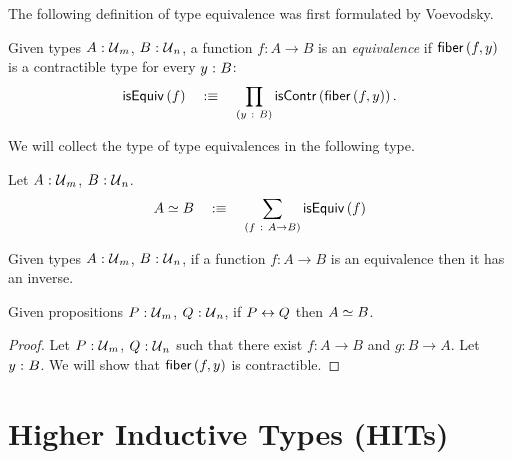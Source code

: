 The following definition of type equivalence was first formulated by Voevodsky.

\begin{defn}
  Given types $A\hspace{0.1mm}:\hspace{0.1mm}\mathcal{U}{}_m$, $B\hspace{0.1mm}:\hspace{0.1mm}\mathcal{U}{}_n$, a function $f : A \rightarrow B$ is an
  \emph{equivalence} if $\mathsf{fiber}\left(f, y\right)$ is a contractible type for every $y\hspace{0.1mm}:\hspace{0.1mm}B$:
  \begin{equation*}
    \mathsf{isEquiv}\left(f\right) \quad:\equiv\quad \prod_{(y~:~B)} \mathsf{isContr}\left(\mathsf{fiber}\left(f, y\right)\right).
  \end{equation*}
\end{defn}

We will collect the type of type equivalences in the following type.

\begin{defn}
  Let $A\hspace{0.1mm}:\hspace{0.1mm}\mathcal{U}{}_m$, $B\hspace{0.1mm}:\hspace{0.1mm}\mathcal{U}{}_n$.
  \begin{equation*}
    A \simeq B \quad:\equiv\quad \sum_{(f~:~A \rightarrow B)} \mathsf{isEquiv}\left(f\right)
  \end{equation*}
\end{defn}

\begin{prop}
  Given types $A\hspace{0.1mm}:\hspace{0.1mm}\mathcal{U}{}_m$, $B\hspace{0.1mm}:\hspace{0.1mm}\mathcal{U}{}_n$, if a function $f : A \rightarrow B$
  is an equivalence then it has an inverse.
\end{prop}

\begin{prop}\label{prop:iff-equiv}
  Given propositions $P\hspace{0.1mm}:\hspace{0.1mm}\mathcal{U}{}_m$, $Q\hspace{0.1mm}:\hspace{0.1mm}\mathcal{U}{}_n$, if $P \leftrightarrow Q$
  then $A \simeq B$.
\end{prop}
\begin{proof}
  Let $P\hspace{0.1mm}:\hspace{0.1mm}\mathcal{U}{}_m$, $Q\hspace{0.1mm}:\hspace{0.1mm}\mathcal{U}{}_n$ such that there exist $f : A \rightarrow B$ and
  $g : B \rightarrow A$. Let $y\hspace{0.1mm}:\hspace{0.1mm}B$. We will show that $\mathsf{fiber}\left(f, y\right)$ is contractible.
\end{proof}

\section{Higher Inductive Types (HITs)}
